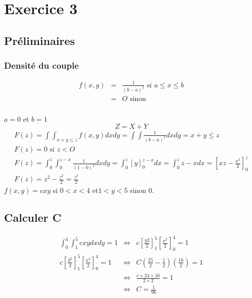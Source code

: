 \documentclass[a4paper, 11pt]{article}
\begin{document}
	\maketitle
	\section{Exercice 3}
	\subsection{Préliminaires}
	\subsubsection{Densité du couple}

	\begin{eqnarray*}
		f(x,y) &=&  \frac{1}{(b-a)^2} \textrm{ si }a \leq x \leq b\\
		&=&  O \textrm{ sinon }
	\end{eqnarray*}
	\subsubsection{}
	$a=0$ et $b=1$
	$$Z=X+Y$$
	\begin{eqnarray*}
		F(z) = \int \int_{x+y \leq z} f(x,y) dxdy = \int \int \frac{1}{(b-a)^2}dxdy = x+y \leq z\\
		F(z) = 0 \textrm{ si } z < O\\
		F(z) = \int^z_0 \int^{z-x}_0 \frac{1}{(1-0)^2}dxdy = \int^z_0 [y]^{z-x}_0 dx = \int^z_0 z-x dx = [xz - \frac{x^2}{2}]^z_0\\
		F(z) = z^2 - \frac{z^2}{2} = \frac{z^2}{2}
	\end{eqnarray*}
	$f(x,y) = cxy$ si $0 < x < 4$ et$ 1 < y < 5$ sinon $0$.
	\subsection{Calculer C}
	\begin{eqnarray*}
		\int^4_0 \int^5_1 cxydxdy=1 &\Leftrightarrow& c[\frac{y2}{2}]^5_1[\frac{x^2}{2}]^4_0 = 1\\
		c[\frac{y^2}{2}]^5_1[\frac{x^2}{2}]^4_0 = 1 &\Leftrightarrow& C(\frac{25}{2} - \frac{1}{2})(\frac{16}{2}) = 1\\
		&\Leftrightarrow& \frac{c\times 24 \times 16}{2 \times 2} = 1\\ &\Leftrightarrow& C = \frac{1}{96}
	\end{eqnarray*}
\end{document}
